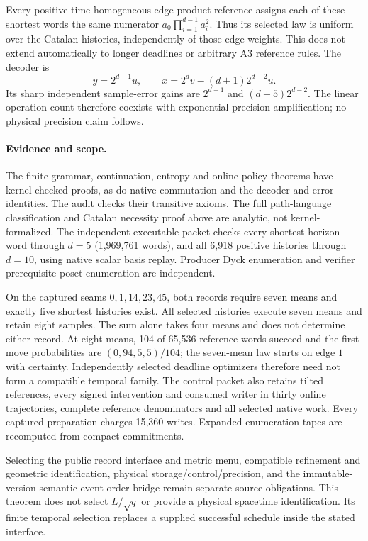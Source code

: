 Every positive time-homogeneous edge-product reference assigns each of
these shortest words the same numerator
$a_0\prod_{i=1}^{d-1}a_i^2$. Thus its selected law is uniform over the
Catalan histories, independently of those edge weights. This does not
extend automatically to longer deadlines or arbitrary A3 reference rules.
The decoder is
\[
 y=2^{d-1}u,\qquad x=2^dv-(d+1)2^{d-2}u.
\]
Its sharp independent sample-error gains are $2^{d-1}$ and
$(d+5)2^{d-2}$. The linear operation count therefore coexists with
exponential precision amplification; no physical precision claim follows.

\paragraph{Evidence and scope.}
The finite grammar, continuation, entropy and online-policy theorems have
kernel-checked proofs, as do native commutation and the decoder and error
identities. The audit checks their transitive axioms. The full path-language
classification and Catalan necessity proof above are analytic, not
kernel-formalized. The independent executable packet checks every
shortest-horizon word through $d=5$ (1,969,761 words), and all 6,918 positive
histories through $d=10$, using native scalar basis replay. Producer Dyck
enumeration and verifier prerequisite-poset enumeration are independent.

On the captured seams $0,1,14,23,45$, both records require seven means and
exactly five shortest histories exist. All selected histories execute
seven means and retain eight samples. The sum alone takes four means and
does not determine either record. At eight means, 104 of 65,536 reference
words succeed and the first-move probabilities are $(0,94,5,5)/104$; the
seven-mean law starts on edge $1$ with certainty. Independently selected
deadline optimizers therefore need not form a compatible temporal family.
The control packet also retains tilted references, every signed
intervention and consumed writer in thirty online trajectories, complete
reference denominators and all selected native work. Every captured
preparation charges 15,360 writes. Expanded enumeration tapes are
recomputed from compact commitments.

Selecting the public record interface and metric menu, compatible
refinement and geometric identification, physical storage/control/precision,
and the immutable-version semantic event-order bridge remain separate
source obligations. This theorem does not select $L/\sqrt q$ or provide a
physical spacetime identification. Its finite temporal selection replaces a
supplied successful schedule inside the stated interface.
